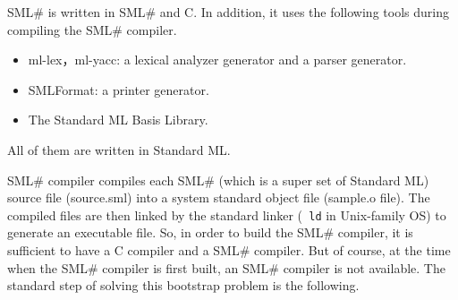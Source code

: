 \documentclass{jbook}
\newcommand{\smlsharp}{SML\#}
\begin{document}
	\smlsharp{} is written in \smlsharp{} and C.
	In addition, it uses the following tools during compiling the
\smlsharp{} compiler.
\begin{itemize}
\item ml-lex，ml-yacc: a lexical analyzer generator and a parser generator.
\item SMLFormat: a printer generator.
\item The Standard ML Basis Library.
\end{itemize}
	All of them are written in Standard ML.

	\smlsharp{} compiler compiles each \smlsharp{} (which is a super
set of Standard ML) source file (source.sml) into a system standard
object file (sample.o file).
	The compiled files are then linked by the standard linker ({\tt
ld} in Unix-family OS) to generate an executable file.
	So, in order to build the \smlsharp{} compiler, it is sufficient
to have a C compiler and a \smlsharp{} compiler.
	But of course, at the time when the \smlsharp{} compiler is
first built, an \smlsharp{} compiler is not available.
	The standard step of solving this bootstrap problem is the
following.
\end{document}
